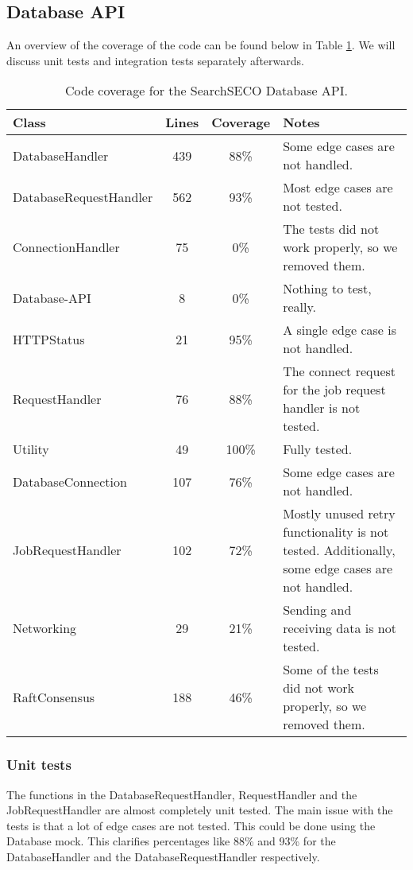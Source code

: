 \documentclass[./Main.tex]{subfiles}
\begin{document}
\newpage
\tocless\subsection{Database API}
An overview of the coverage of the code can be found below in Table \ref{tabledbapi}. We will discuss unit tests and integration tests separately afterwards.

\begin{table}[h]
    \centering
    \begin{tabular}{l|c|c|p{7cm}}
    Class & Lines & Coverage & Notes    \\ \hline
        DatabaseHandler & 439 & 88\% & Some edge cases are not handled.\\
        DatabaseRequestHandler & 562 & 93\% & Most edge cases are not tested.\\
        ConnectionHandler & 75 & 0\% & The tests did not work properly, so we removed them. \\
        Database-API & 8 & 0\% & Nothing to test, really. \\
        HTTPStatus & 21 & 95\% & A single edge case is not handled. \\
        RequestHandler & 76 & 88\% & The connect request for the job request handler is not tested.\\
        Utility & 49 & 100\% & Fully tested.\\
        DatabaseConnection & 107 & 76\% & Some edge cases are not handled. \\
        JobRequestHandler & 102 & 72\% & Mostly unused retry functionality is not tested. Additionally, some edge cases are not handled.\\
        Networking & 29 & 21\% & Sending and receiving data is not tested. \\
        RaftConsensus & 188 & 46\% & Some of the tests did not work properly, so we removed them.
    \end{tabular}
    \caption{Code coverage for the SearchSECO Database API.}
    \label{tabledbapi}
\end{table}

\tocless\subsubsection{Unit tests}
The functions in the DatabaseRequestHandler, RequestHandler and the JobRequestHandler are almost completely unit tested. The main issue with the tests is that a lot of edge cases are not tested. This could be done using the Database mock. This clarifies percentages like 88\% and 93\% for the DatabaseHandler and the DatabaseRequestHandler respectively.\\
\end{document}
